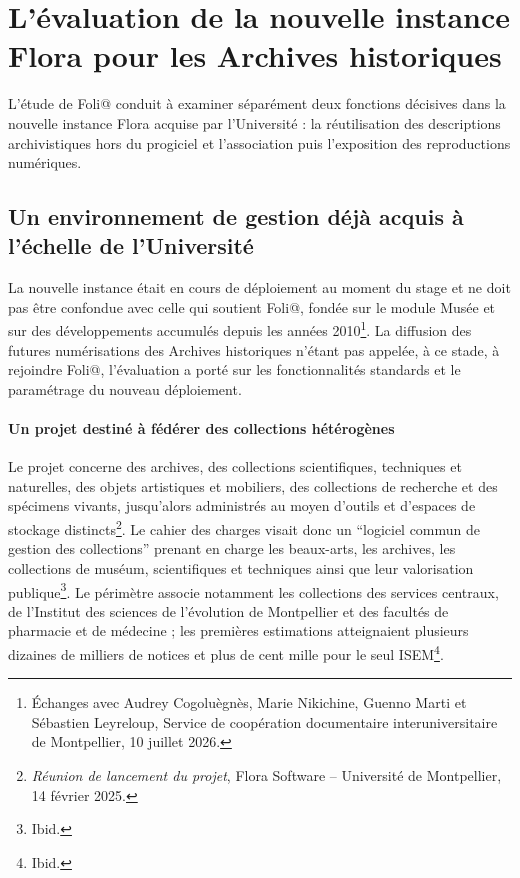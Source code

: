 \section{L'évaluation de la nouvelle instance Flora pour les Archives historiques}
\label{sec:flora-architecture-documentaire}

L'étude de Foli@ conduit à examiner séparément deux fonctions décisives dans la nouvelle instance Flora acquise par l'Université : la réutilisation des descriptions archivistiques hors du progiciel et l'association puis l'exposition des reproductions numériques.


\subsection{Un environnement de gestion déjà acquis à l'échelle de l'Université}

La nouvelle instance était en cours de déploiement au moment du stage et ne doit pas être confondue avec celle qui soutient Foli@, fondée sur le module Musée et sur des développements accumulés depuis les années 2010\footnote{Échanges avec Audrey Cogoluègnès, Marie Nikichine, Guenno Marti et Sébastien Leyreloup, Service de coopération documentaire interuniversitaire de Montpellier, 10 juillet 2026.}. La diffusion des futures numérisations des Archives historiques n'étant pas appelée, à ce stade, à rejoindre Foli@, l'évaluation a porté sur les fonctionnalités standards et le paramétrage du nouveau déploiement.

\paragraph{Un projet destiné à fédérer des collections hétérogènes}

Le projet concerne des archives, des collections scientifiques, techniques et naturelles, des objets artistiques et mobiliers, des collections de recherche et des spécimens vivants, jusqu'alors administrés au moyen d'outils et d'espaces de stockage distincts\footnote{\emph{Réunion de lancement du projet}, Flora Software -- Université de Montpellier, 14 février 2025.}. Le cahier des charges visait donc un \enquote{logiciel commun de gestion des collections} prenant en charge les beaux-arts, les archives, les collections de muséum, scientifiques et techniques ainsi que leur valorisation publique\footnote{Ibid.}. Le périmètre associe notamment les collections des services centraux, de l'Institut des sciences de l'évolution de Montpellier et des facultés de pharmacie et de médecine ; les premières estimations atteignaient plusieurs dizaines de milliers de notices et plus de cent mille pour le seul ISEM\footnote{Ibid.}.

